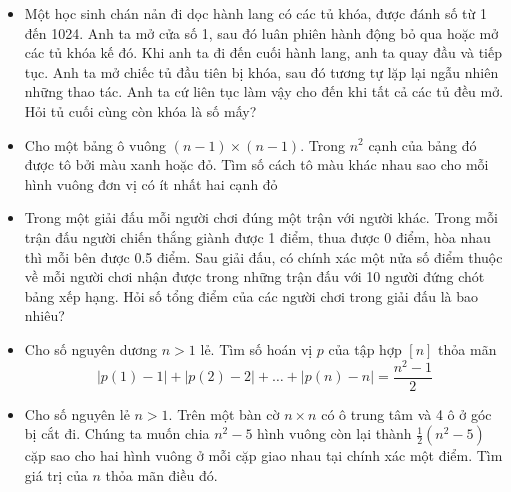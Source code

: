\documentclass[11pt]{scrartcl}
\begin{document}
\setcounter{page}{1}
\thispagestyle{plain}
\begin{itemize}[label=, leftmargin=0em, itemsep=-0em]
    
    \item \begin{btvn}%
        Một học sinh chán nản đi dọc hành lang có các tủ khóa, được đánh số từ 1 đến 1024. Anh ta mở cửa số 1, sau đó luân phiên hành động bỏ qua hoặc mở các tủ khóa kế đó. Khi anh ta đi đến cuối hành lang, anh ta quay đầu và tiếp tục. Anh ta mở chiếc tủ đầu tiên bị khóa, sau đó tương tự lặp lại ngẫu nhiên những thao tác. Anh ta cứ liên tục làm vậy cho đến khi tất cả các tủ đều mở. Hỏi tủ cuối cùng còn khóa là số mấy?
    \end{btvn}

    \item \begin{btvn} Cho một bảng ô vuông $(n - 1)\times(n - 1)$. Trong $n^2$ cạnh của bảng đó được tô bởi màu xanh hoặc đỏ. Tìm số cách tô màu khác nhau sao cho mỗi hình vuông đơn vị có ít nhất hai cạnh đỏ
    \end{btvn}

    \item\begin{btvn}%
        Trong một giải đấu mỗi người chơi đúng một trận với người khác. Trong mỗi trận đấu người chiến thắng giành được 1 điểm, thua được 0 điểm, hòa nhau thì mỗi bên được 0.5 điểm. Sau giải đấu, có chính xác một nửa số điểm thuộc về mỗi người chơi nhận được trong những trận đấu với 10 người đứng chót bảng xếp hạng. Hỏi số tổng điểm của các người chơi trong giải đấu là bao nhiêu?
    \end{btvn}

    \item \begin{btvn}%
        Cho số nguyên dương $n > 1$ lẻ. Tìm số hoán vị $p$ của tập hợp $[n]$ thỏa mãn
    \[
        |p(1) - 1| + |p(2) - 2| +\dots + |p(n) -n| = \frac{n^2 - 1}{2}
    \]
        
    \end{btvn}

    \item \begin{btvn} Cho số nguyên lẻ $n > 1$. Trên một bàn cờ $n \times n$ có ô trung tâm và 4 ô ở góc bị cắt đi. Chúng ta muốn chia $n^2 -5$ hình vuông còn lại thành $\frac{1}{2}(n^2 - 5)$ cặp sao cho hai hình vuông ở mỗi cặp giao nhau tại chính xác một điểm. Tìm giá trị của $n$ thỏa mãn điều đó.
    \end{btvn}


\end{itemize}
\end{document}
